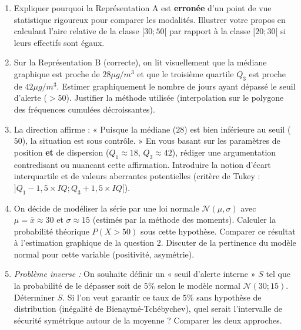 \documentclass[11pt]{article}
\begin{document}
\begin{exercice}
\begin{enumerate}
    \item Expliquer pourquoi la Représentation A est \textbf{erronée} d'un point de vue statistique rigoureux pour comparer les modalités. Illustrer votre propos en calculant l'aire relative de la classe $[30; 50[$ par rapport à la classe $[20; 30[$ si leurs effectifs sont égaux.
    \item Sur la Représentation B (correcte), on lit visuellement que la médiane graphique est proche de $28 \mu g/m^3$ et que le troisième quartile $Q_3$ est proche de $42 \mu g/m^3$. Estimer graphiquement le nombre de jours ayant dépassé le seuil d'alerte ($> 50$). Justifier la méthode utilisée (interpolation sur le polygone des fréquences cumulées décroissantes).
    \item La direction affirme : « Puisque la médiane ($28$) est bien inférieure au seuil ($50$), la situation est sous contrôle. » En vous basant sur les paramètres de position \textbf{et} de dispersion ($Q_1 \approx 18$, $Q_3 \approx 42$), rédiger une argumentation contredisant ou nuancant cette affirmation. Introduire la notion d'écart interquartile et de valeurs aberrantes potentielles (critère de Tukey : $]Q_1 - 1,5 \times IQ ; Q_3 + 1,5 \times IQ[$).
    \item On décide de modéliser la série par une loi normale $\mathcal{N}(\mu, \sigma)$ avec $\mu = \bar{x} \approx 30$ et $\sigma \approx 15$ (estimés par la méthode des moments). Calculer la probabilité théorique $P(X > 50)$ sous cette hypothèse. Comparer ce résultat à l'estimation graphique de la question 2. Discuter de la pertinence du modèle normal pour cette variable (positivité, asymétrie).
    \item \textit{Problème inverse :} On souhaite définir un « seuil d'alerte interne » $S$ tel que la probabilité de le dépasser soit de $5\%$ selon le modèle normal $\mathcal{N}(30; 15)$. Déterminer $S$. Si l'on veut garantir ce taux de $5\%$ sans hypothèse de distribution (inégalité de Bienaymé-Tchébychev), quel serait l'intervalle de sécurité symétrique autour de la moyenne ? Comparer les deux approches.
\end{enumerate}
\end{exercice}
\end{document}

